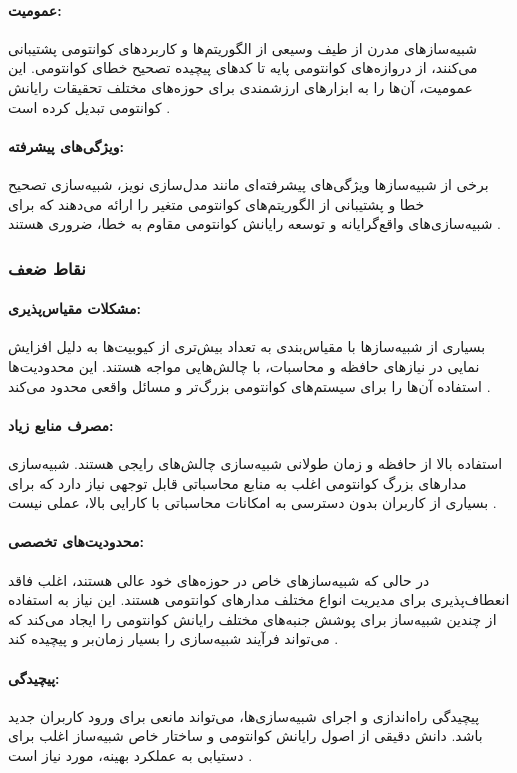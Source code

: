 \paragraph{عمومیت:}
شبیه‌سازهای مدرن از طیف وسیعی از الگوریتم‌ها و کاربردهای کوانتومی پشتیبانی می‌کنند، از دروازه‌های کوانتومی پایه تا کدهای پیچیده تصحیح خطای کوانتومی. این عمومیت، آن‌ها را به ابزارهای ارزشمندی برای حوزه‌های مختلف تحقیقات رایانش کوانتومی تبدیل کرده است \cite{xu_herculean_2023}.
\paragraph{ویژگی‌های پیشرفته:}
برخی از شبیه‌سازها ویژگی‌های پیشرفته‌ای مانند مدل‌سازی نویز، شبیه‌سازی تصحیح خطا و پشتیبانی از الگوریتم‌های کوانتومی متغیر را ارائه می‌دهند که برای شبیه‌سازی‌های واقع‌گرایانه و توسعه رایانش کوانتومی مقاوم به خطا، ضروری هستند \cite{jamadagni_benchmarking_2024}.
\subsubsection{نقاط ضعف}
\paragraph{مشکلات مقیاس‌پذیری:}
بسیاری از شبیه‌سازها با مقیاس‌بندی به تعداد بیش‌تری از کیوبیت‌ها به دلیل افزایش نمایی در نیازهای حافظه و محاسبات، با چالش‌هایی مواجه هستند. این محدودیت‌ها استفاده آن‌ها را برای سیستم‌های کوانتومی بزرگ‌تر و مسائل واقعی محدود می‌کند \cite{xu_herculean_2023}.
\paragraph{مصرف منابع زیاد:}
استفاده بالا از حافظه و زمان طولانی شبیه‌سازی چالش‌های رایجی هستند. شبیه‌سازی مدارهای بزرگ کوانتومی اغلب به منابع محاسباتی قابل توجهی نیاز دارد که برای بسیاری از کاربران بدون دسترسی به امکانات محاسباتی با کارایی بالا، عملی نیست \cite{young_simulating_2023}.
\paragraph{محدودیت‌های تخصصی:}
در حالی که شبیه‌سازهای خاص در حوزه‌های خود عالی هستند، اغلب فاقد انعطاف‌پذیری برای مدیریت انواع مختلف مدارهای کوانتومی هستند. این نیاز به استفاده از چندین شبیه‌ساز برای پوشش جنبه‌های مختلف رایانش کوانتومی را ایجاد می‌کند که می‌تواند فرآیند شبیه‌سازی را بسیار زمان‌بر و پیچیده کند \cite{jamadagni_benchmarking_2024}.
\paragraph{پیچیدگی:}
پیچیدگی راه‌اندازی و اجرای شبیه‌سازی‌ها، می‌تواند مانعی برای ورود کاربران جدید باشد. دانش دقیقی از اصول رایانش کوانتومی و ساختار خاص شبیه‌ساز اغلب برای دستیابی به عملکرد بهینه، مورد نیاز است \cite{jamadagni_benchmarking_2024}.
